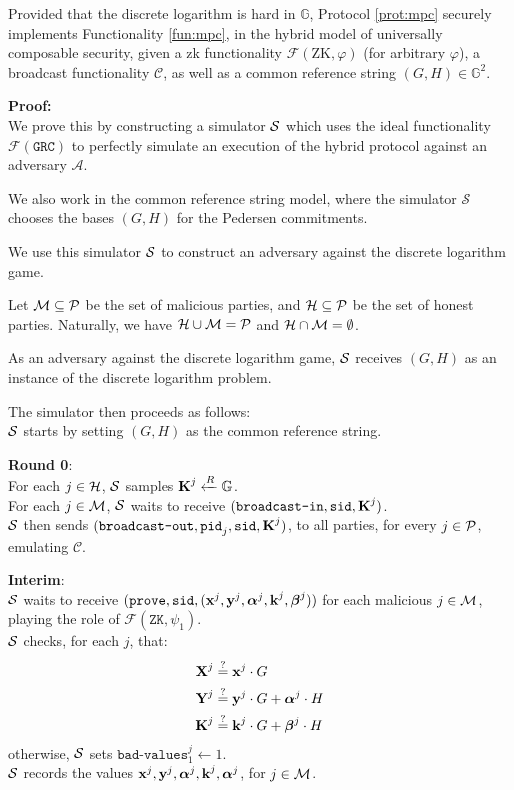 \begin{claim}
Provided that the discrete logarithm is hard in $\mathbb{G}$, Protocol \ref{prot:mpc} securely implements Functionality \ref{fun:mpc},
in the hybrid model of universally composable security,
given a zk functionality $\mathcal{F}(\text{ZK}, \varphi)$ (for arbitrary $\varphi$),
a broadcast functionality $\mathcal{C}$, as well as a common reference string
${(G, H) \in \mathbb{G}^2}$.
\end{claim}
\textbf{Proof:}\\
We prove this by constructing a simulator $\mathcal{S}$ which uses
the ideal functionality $\mathcal{F}(\texttt{GRC})$ to perfectly
simulate an execution of the hybrid protocol against an adversary
$\mathcal{A}$.

We also work in the common reference string model, where the simulator
$\mathcal{S}$ chooses the bases $(G, H)$ for the Pedersen commitments.

We use this simulator $\mathcal{S}$ to construct an adversary against
the discrete logarithm game.

Let $\mathcal{M} \subseteq \mathcal{P}$ be the set of malicious parties,
and $\mathcal{H} \subseteq \mathcal{P}$ be the set of honest parties. Naturally,
we have $\mathcal{H} \cup \mathcal{M} = \mathcal{P}$ and $\mathcal{H} \cap \mathcal{M} = \emptyset$.

As an adversary against the discrete logarithm game,
$\mathcal{S}$ receives $(G, H)$ as an instance 
of the discrete logarithm problem.

The simulator then proceeds as follows:\\
$\mathcal{S}$ starts by setting $(G, H)$ as the common reference string.

\textbf{Round 0}:\\
For each $j \in \mathcal{H}$, $\mathcal{S}$ samples $\textbf{K}^j \xleftarrow{R} \mathbb{G}$.\\
For each $j \in \mathcal{M}$,
$\mathcal{S}$ waits to receive $(\texttt{broadcast-in}, \texttt{sid}, \textbf{K}^j)$.\\
$\mathcal{S}$ then sends $(\texttt{broadcast-out}, \texttt{pid}_j, \texttt{sid}, \textbf{K}^j)$,
to all parties, for every $j \in \mathcal{P}$, emulating $\mathcal{C}$.

\textbf{Interim}:\\
$\mathcal{S}$ waits to receive $(\texttt{prove}, \texttt{sid}, (\textbf{x}^j, \textbf{y}^j, \boldsymbol{\alpha}^j, \textbf{k}^j, \boldsymbol{\beta}^j))$
for each malicious ${j \in \mathcal{M}}$,
playing the role of $\mathcal{F}(\texttt{ZK}, \psi_1)$.\\
$\mathcal{S}$ checks, for each $j$, that:
$$
\begin{aligned}
\textbf{X}^j &\stackrel{?}{=} \textbf{x}^j \cdot G\\
\textbf{Y}^j &\stackrel{?}{=} \textbf{y}^j \cdot G + \boldsymbol{\alpha}^j \cdot H\\
\textbf{K}^j &\stackrel{?}{=} \textbf{k}^j \cdot G + \boldsymbol{\beta}^j \cdot H
\end{aligned}
$$
otherwise, $\mathcal{S}$ sets $\texttt{bad-values}^j_1 \gets 1$.\\
$\mathcal{S}$ records the values $\textbf{x}^j, \textbf{y}^j, \boldsymbol{\alpha}^j, \textbf{k}^j, \boldsymbol{\alpha}^j$, for $j \in \mathcal{M}$.\\

